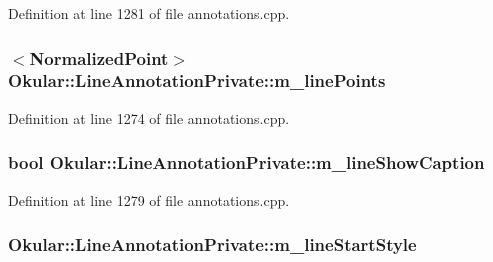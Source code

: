 Definition at line 1281 of file annotations.\+cpp.

\hypertarget{classOkular_1_1LineAnnotationPrivate_ad1c827db72218f6c718da80220e4a7f7}{
\subsubsection[{m\+\_\+line\+Points}]{$<${\bf Normalized\+Point}$>$ Okular\+::\+Line\+Annotation\+Private\+::m\+\_\+line\+Points}}\label{classOkular_1_1LineAnnotationPrivate_ad1c827db72218f6c718da80220e4a7f7}


Definition at line 1274 of file annotations.\+cpp.

\hypertarget{classOkular_1_1LineAnnotationPrivate_a1260f459bf184a0606df9fa329406c21}{
\subsubsection[{m\+\_\+line\+Show\+Caption}]{\setlength{\rightskip}{0pt plus 5cm}bool Okular\+::\+Line\+Annotation\+Private\+::m\+\_\+line\+Show\+Caption}}\label{classOkular_1_1LineAnnotationPrivate_a1260f459bf184a0606df9fa329406c21}


Definition at line 1279 of file annotations.\+cpp.

\hypertarget{classOkular_1_1LineAnnotationPrivate_aabf0926a14575248365c4e5de9d11296}{
\subsubsection[{m\+\_\+line\+Start\+Style}]{ Okular\+::\+Line\+Annotation\+Private\+::m\+\_\+line\+Start\+Style}}\label{classOkular_1_1LineAnnotationPrivate_aabf0926a14575248365c4e5de9d11296}


